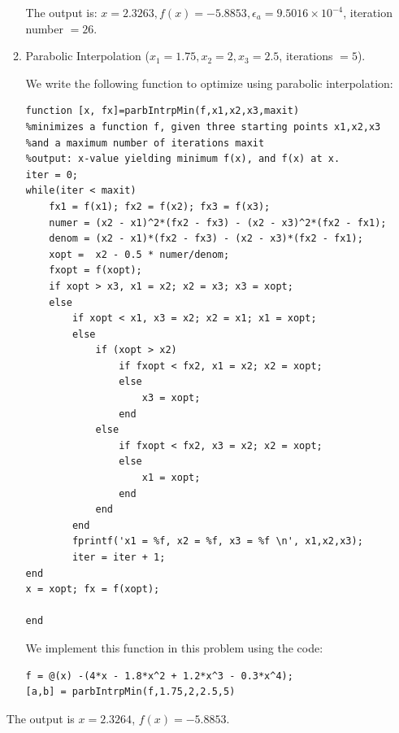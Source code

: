 \documentclass[12pt]{amsart}
\begin{document}
\begin{enumerate}
\begin{enumerate}
The output is: $x = 2.3263, f(x) = -5.8853, \epsilon_a = 9.5016 \times 10^{-4}$, iteration number $= 26$.

\item Parabolic Interpolation ($x_1 = 1.75, x_2 = 2, x_3 = 2.5$, iterations
$= 5$).

We write the following function to optimize using parabolic interpolation:

\begin{verbatim}
function [x, fx]=parbIntrpMin(f,x1,x2,x3,maxit)
%minimizes a function f, given three starting points x1,x2,x3
%and a maximum number of iterations maxit
%output: x-value yielding minimum f(x), and f(x) at x.
iter = 0;
while(iter < maxit)
    fx1 = f(x1); fx2 = f(x2); fx3 = f(x3);
    numer = (x2 - x1)^2*(fx2 - fx3) - (x2 - x3)^2*(fx2 - fx1);
    denom = (x2 - x1)*(fx2 - fx3) - (x2 - x3)*(fx2 - fx1);
    xopt =  x2 - 0.5 * numer/denom;
    fxopt = f(xopt);
    if xopt > x3, x1 = x2; x2 = x3; x3 = xopt;
    else
        if xopt < x1, x3 = x2; x2 = x1; x1 = xopt;
        else
            if (xopt > x2)
                if fxopt < fx2, x1 = x2; x2 = xopt;
                else
                    x3 = xopt;
                end
            else
                if fxopt < fx2, x3 = x2; x2 = xopt;
                else
                    x1 = xopt;
                end
            end
        end
        fprintf('x1 = %f, x2 = %f, x3 = %f \n', x1,x2,x3);
        iter = iter + 1;
end
x = xopt; fx = f(xopt);

end
\end{verbatim}

We implement this function in this problem using
the code:
\begin{verbatim}
f = @(x) -(4*x - 1.8*x^2 + 1.2*x^3 - 0.3*x^4);
[a,b] = parbIntrpMin(f,1.75,2,2.5,5)
\end{verbatim}
\end{enumerate}

The output is $x = 2.3264$, $f(x) = -5.8853$.

\vfill
\pagebreak


\end{enumerate}
\end{document}
